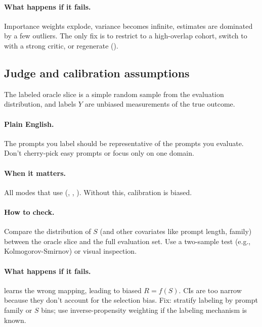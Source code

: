 \paragraph{What happens if it fails.} Importance weights explode, variance becomes infinite, estimates are dominated by a few outliers. The only fix is to restrict to a high-overlap cohort, switch to \dr{} with a strong critic, or regenerate (\dm).

\subsection{Judge and calibration assumptions}

\begin{assumption}
\label{assum:oracle}
The labeled oracle slice is a simple random sample from the evaluation distribution, and labels $Y$ are unbiased measurements of the true outcome.
\end{assumption}

\paragraph{Plain English.} The prompts you label should be representative of the prompts you evaluate. Don't cherry-pick easy prompts or focus only on one domain.

\paragraph{When it matters.} All modes that use \autocal{} (\dm, \ips, \dr). Without this, calibration is biased.

\paragraph{How to check.} Compare the distribution of $S$ (and other covariates like prompt length, family) between the oracle slice and the full evaluation set. Use a two-sample test (e.g., Kolmogorov-Smirnov) or visual inspection.

\paragraph{What happens if it fails.} \autocal{} learns the wrong mapping, leading to biased $R = f(S)$. CIs are too narrow because they don't account for the selection bias. Fix: stratify labeling by prompt family or $S$ bins; use inverse-propensity weighting if the labeling mechanism is known.

